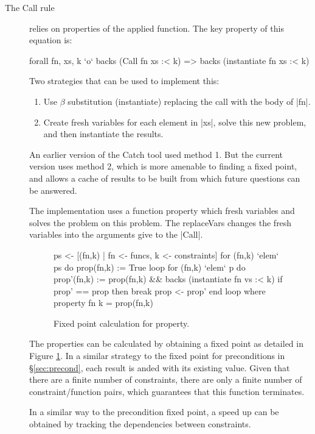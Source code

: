 \documentclass[preprint]{sigplanconf}
\newcommand{\C}[1]{\textsf{#1}}
\begin{document}
\begin{description}
\item[The \C{Call} rule] relies on properties of the applied function. The key property of this equation is:

    \begin{code}
    forall fn, xs, k `o`  backs (Call fn xs :< k) =>
                          backs (instantiate fn xs :< k)
    \end{code}

    Two strategies that can be used to implement this:

    \begin{enumerate}
    \item Use $\beta$ substitution (\C{instantiate}) replacing the call with the body of |fn|.
    \item Create fresh variables for each element in |xs|, solve this new problem, and then instantiate the results.
    \end{enumerate}

    An earlier version of the Catch tool \citep{me:catch_tfp} used method 1. But the current version uses method 2, which is more amenable to finding a fixed point, and allows a cache of results to be built from which future questions can be answered.

    The implementation uses a function \C{property} which fresh variables and solves the problem on this problem. The \C{replaceVars} changes the fresh variables into the arguments give to the |Call|.

    \begin{figure}
    \begin{code}
    ps <- [(fn,k) | fn <- funcs, k <- constraints]
    for (fn,k) `elem` ps do prop(fn,k) := True
    loop
        for (fn,k) `elem` p do
            prop'(fn,k) := prop(fn,k) && backs (instantiate fn vs :< k)
        if prop' == prop then break
        prop <- prop'
    end loop
        where
            property fn k = prop(fn,k)
    \end{code}
    \caption{Fixed point calculation for \C{property}.}
    \label{fig:property_fixp}
    \end{figure}

    The properties can be calculated by obtaining a fixed point as detailed in Figure \ref{fig:property_fixp}. In a similar strategy to the fixed point for preconditions in \S\ref{sec:precond}, each result is anded with its existing value. Given that there are a finite number of constraints, there are only a finite number of constraint/function pairs, which guarantees that this function terminates.

    In a similar way to the precondition fixed point, a speed up can be obtained by tracking the dependencies between constraints.
\end{description}
\end{document}
